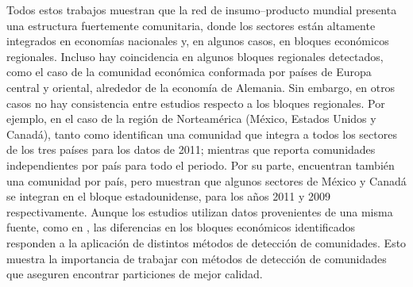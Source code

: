 Todos estos trabajos muestran que la red de insumo--producto mundial presenta una estructura fuertemente comunitaria, donde los sectores están altamente integrados en economías nacionales y, en algunos casos, en bloques económicos regionales. Incluso hay coincidencia en algunos bloques regionales detectados, como el caso de la comunidad económica conformada por países de Europa central y oriental, alrededor de la economía de Alemania. Sin embargo, en otros casos no hay consistencia entre estudios respecto a los bloques regionales. Por ejemplo, en el caso de la región de Norteamérica (México, Estados Unidos y Canadá), tanto \textcite{Tsekeris2017} como \textcite{Piccardi2018} identifican una comunidad que integra a todos los sectores de los tres países para los datos de 2011; mientras que \textcite{Kireyev2022} reporta comunidades independientes por país para todo el periodo. Por su parte, \textcite{Cerina2015, Xu2019} encuentran también una comunidad por país, pero muestran que algunos sectores de México y Canadá se integran en el bloque estadounidense, para los años 2011 y 2009 respectivamente. Aunque los estudios utilizan datos provenientes de una misma fuente, como en \textcite{Cerina2015, Piccardi2018, Xu2019}, las diferencias en los bloques económicos identificados responden a la aplicación de distintos métodos de detección de comunidades. Esto muestra la importancia de trabajar con métodos de detección de comunidades que aseguren encontrar particiones de mejor calidad.




